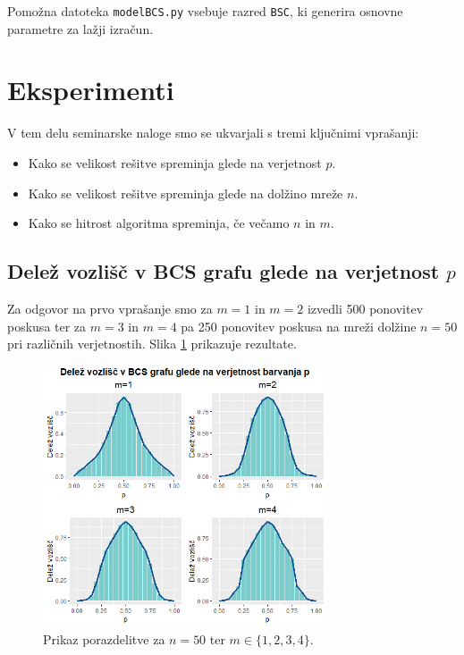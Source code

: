 \documentclass[a4paper, 11pt]{article}
\theoremstyle{definition}
\theoremstyle{definition}
\begin{document}
Pomožna datoteka \verb+modelBCS.py+ vsebuje razred
\verb+BSC+, ki generira osnovne parametre za lažji izračun.
\newpage

\section{Eksperimenti}


V tem delu seminarske naloge smo se ukvarjali s tremi ključnimi vprašanji:
    
\begin{itemize}
\item 
Kako se velikost rešitve spreminja glede na verjetnost $p$.
\item
Kako se velikost rešitve spreminja glede na dolžino mreže $n$.
\item 
Kako se hitrost algoritma spreminja, če večamo $n$ in $m$.
\end{itemize}

\subsection{Delež vozlišč v BCS grafu glede na verjetnost $p$} 

Za odgovor na prvo vprašanje smo za $m=1$ in $m=2$ izvedli 500 ponovitev 
poskusa ter za $m=3$ in $m=4$ pa 250 ponovitev poskusa na mreži dolžine $n=50$ pri različnih verjetnostih. 
Slika \ref{fig:verj} prikazuje rezultate.

\begin{figure}[ht!]
    \centering
    \includegraphics[width=0.75\textwidth]{verj.png}
    \caption{Prikaz porazdelitve za $n=50$ ter $m \in \{ 1,2,3,4 \}$.}
    \label{fig:verj}
\end{figure}
\end{document}
